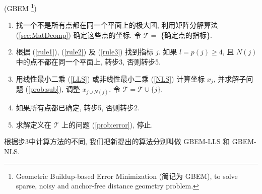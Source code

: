 \begin{Alg} (GBEM \footnote{Geometric Buildup-based Error Minimization (简记为 GBEM), to solve sparse, noisy and anchor-free distance geometry problem.})
  \begin{adjustwidth}{1cm}{0cm}
    \begin{enumerate}[步1.]
      \item 找一个不是所有点都在同一个平面上的极大团, 利用矩阵分解算法 (\ref{sec:MatDcomp}) 确定这些点的坐标. 令 $\mathcal{T}=$ \{确定点的指标\}.
      \item 根据 (\ref{rule1}), (\ref{rule2}) 及 (\ref{rule3}) 找到指标 $j$. 如果 $l=p(j)\geq 4$, 且 $N(j)$ 中的点不都在同一个平面上, 转步3, 否则转步5.
      \item 用线性最小二乘 (\ref{LLS}) 或非线性最小二乘 (\ref{NLS}) 计算坐标 $x_j$, 并求解子问题 (\ref{prob:sub}), 调整 $x_{j\cup N(j)}$. 令 $\mathcal{T}=\mathcal{T}\cup \{j\}$.
      \item 如果所有点都已确定, 转步5, 否则转步2.
      \item 求解定义在 $\mathcal{T}$ 上的问题 (\ref{prob:error}), 停止.
    \end{enumerate}
  \end{adjustwidth}
  \label{alg:EGB}
\end{Alg}
根据步3中计算方法的不同, 我们把新提出的算法分别叫做
GBEM-LLS 和 GBEM-NLS.

%
%
%

